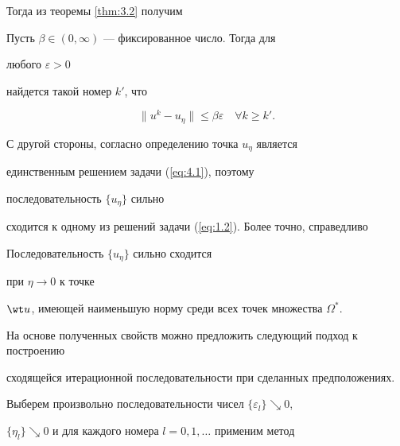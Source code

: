 Тогда из теоремы \ref{thm:3.2} получим





\begin{prop} \label{pro:4.1}


Пусть $\beta\in(0,\infty )$ --- фиксированное число. Тогда для 


любого $\varepsilon >0$ 


найдется такой номер $k'$, что 


\begin{equation} \label{eq:4.7} 


\| u^{k} - u_{\eta} \| \leq \beta \varepsilon \quad \forall k \geq k'.


\end{equation}


\end{prop} 





С другой стороны, согласно определению точка $u_{\eta}$ является


единственным решением задачи (\ref{eq:4.1}), поэтому 


последовательность $\{u_{\eta} \}$ сильно 


сходится к одному из решений задачи (\ref{eq:1.2}). Более точно, справедливо 





\begin{prop}


\label{pro:4.2}


Последовательность $\{u_{\eta} \}$ сильно сходится 


при $\eta \rightarrow 0$ к точке 


$\wt u$, имеющей наименьшую норму среди всех точек множества $\Omega^*$.


\end{prop} 





На основе полученных свойств можно предложить следующий подход к построению 


сходящейся итерационной последовательности при сделанных предположениях. 


Выберем произвольно последовательности чисел $\{\varepsilon_{l}\}\searrow 0$, 


$\{\eta_{l}\}\searrow 0$ и для каждого номера $l=0,1,\dotsc$ применим метод 


